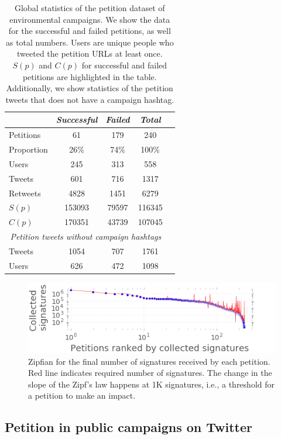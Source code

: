 \begin{table}[hbt!]
\centering
\begin{tabular}{lcccc}
			& \textit{Successful} & \textit{Failed} &  \textit{Total}	\\ \midrule
Petitions			& 61		& 179		& 240		\\
Proportion			& 26\%		& 74\%		& 100\%		\\
Users 				& 245		& 313		& 558		\\
Tweets				& 601		& 716		& 1317		\\
Retweets			& 4828		& 1451		& 6279 		\\
$S(p)$				& 153093	& 79597		& 116345	\\
$C(p)$				& 170351	& 43739		& 107045	\\ \midrule
\multicolumn{4}{c}{\textit{Petition tweets without campaign hashtags}}	\\ \midrule
Tweets				& 1054		& 707		& 1761		\\
Users 				& 626		& 472		& 1098		\\
\end{tabular}
\caption{Global statistics of the petition dataset of environmental campaigns. We show the data for the successful and failed petitions, as well as total numbers. Users are unique people who tweeted the petition URLs at least once. $S(p)$ and $C(p)$ for successful and failed petitions are highlighted in the table. Additionally, we show statistics of the petition tweets that does not have a campaign hashtag.}
\label{tab:petition_tweets}
\end{table}

\begin{figure}
\centering
\includegraphics[scale=0.44]{figures/petitionsVSrank.png}
\caption{Zipfian for the final number of signatures received by each petition. Red line indicates required number of signatures. The change in the slope of the Zipf's law happens at 1K signatures, i.e., a threshold for a petition to make an impact.}
\label{fig:signatures_vs_rank}
\end{figure}

\subsection{Petition in public campaigns on Twitter}

